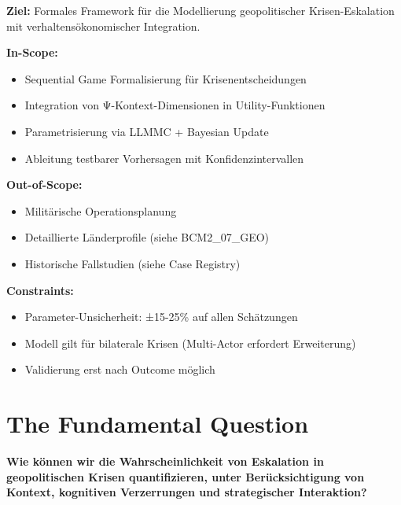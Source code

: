 \begin{tcolorbox}[colback=gray!5!white, colframe=gray!75!black,
    title=Appendix Scope]

\textbf{Ziel:} Formales Framework für die Modellierung geopolitischer Krisen-Eskalation mit verhaltensökonomischer Integration.

\textbf{In-Scope:}
\begin{itemize}[nosep]
\item Sequential Game Formalisierung für Krisenentscheidungen
\item Integration von Ψ-Kontext-Dimensionen in Utility-Funktionen
\item Parametrisierung via LLMMC + Bayesian Update
\item Ableitung testbarer Vorhersagen mit Konfidenzintervallen
\end{itemize}

\textbf{Out-of-Scope:}
\begin{itemize}[nosep]
\item Militärische Operationsplanung
\item Detaillierte Länderprofile (siehe BCM2\_07\_GEO)
\item Historische Fallstudien (siehe Case Registry)
\end{itemize}

\textbf{Constraints:}
\begin{itemize}[nosep]
\item Parameter-Unsicherheit: ±15-25\% auf allen Schätzungen
\item Modell gilt für bilaterale Krisen (Multi-Actor erfordert Erweiterung)
\item Validierung erst nach Outcome möglich
\end{itemize}

\end{tcolorbox}



\section{The Fundamental Question}
\label{sec:crisis-question}

\begin{tcolorbox}[colback=yellow!5!white, colframe=yellow!75!black,
    title=Central Question]
\centering
\textbf{Wie können wir die Wahrscheinlichkeit von Eskalation in geopolitischen Krisen quantifizieren, unter Berücksichtigung von Kontext, kognitiven Verzerrungen und strategischer Interaktion?}
\end{tcolorbox}

